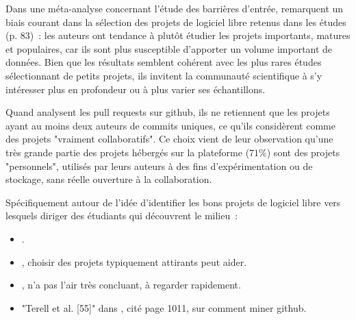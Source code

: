 Dans une méta-analyse concernant l'étude des barrières d'entrée,  remarquent
un biais courant dans la sélection des projets de logiciel libre retenus dans les études (p. 83) : les auteurs
ont tendance à plutôt étudier les projets importants, matures et populaires, car ils sont plus susceptible
d'apporter un volume important de données. Bien que les résultats semblent cohérent avec les plus rares études
sélectionnant de petits projets, ils invitent la communauté scientifique à s'y intéresser plus en profondeur
ou à plus varier ses échantillons.

Quand  analysent les \glspl{pull request} sur \gls{github}, ils ne retiennent
que les projets ayant au moins deux auteurs de \glspl{commit} uniques, ce qu'ils considèrent comme des projets
"vraiment collaboratifs". Ce choix vient de leur observation qu'une très grande partie des projets hébergés
sur la plateforme ($71\%$) sont des projets "personnels", utilisés par leurs auteurs à des fins
d'expérimentation ou de stockage, sans réelle ouverture à la collaboration.


Spécifiquement autour de l'idée d'identifier les bons projets de logiciel libre vers lesquels diriger des
étudiants qui découvrent le milieu :

\begin{itemize}
    \item {}.
    \item {}, choisir des projets typiquement attirants peut aider.
    \item {}, n'a pas l'air très concluant, à regarder rapidement.
    \item "Terell et al. [55]" dans \textcite{barriers-2018}, cité page 1011, sur comment miner \gls{github}.
\end{itemize}
